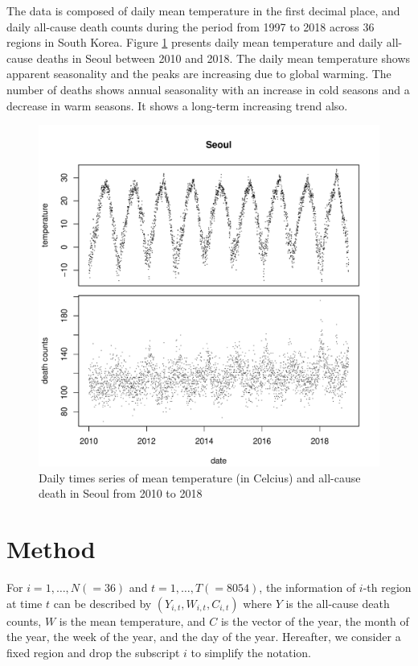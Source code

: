 \documentclass[12pt]{article}
\begin{document}
The data is composed of daily mean temperature in the first decimal place, and
daily all-cause death counts during the period from 1997 to 2018 across 36 regions in South Korea.
Figure \ref{figure:temporal-trend}
presents daily mean temperature and daily all-cause deaths in Seoul between 2010 and 2018.
The daily mean temperature shows apparent seasonality and 
the peaks are increasing due to global warming.
The number of deaths shows annual seasonality 
with an increase in cold seasons and a decrease in warm seasons.
It shows a long-term increasing trend also.

\begin{figure}
	\includegraphics[width = \textwidth]{figures/temporal-trend.pdf}
	\caption{
		Daily times series of 
		mean temperature (in Celcius) and all-cause death in Seoul from 2010 to 2018}
	\label{figure:temporal-trend}
\end{figure}


\section{Method} 
\label{section:method}

For $i = 1, \dots, N(=36)$ and $t = 1, \dots, T(=8054)$, 
the information of $i$-th region at time $t$ can be described by $(Y_{i,t}, W_{i,t}, C_{i,t})$ 
where $Y$ is the all-cause death counts, $W$ is the mean temperature, 
and $C$ is the vector of the year, the month of the year, the week of the year, and the day of the year.
Hereafter, we consider a fixed region and drop the subscript $i$ to simplify the notation.
\end{document}
